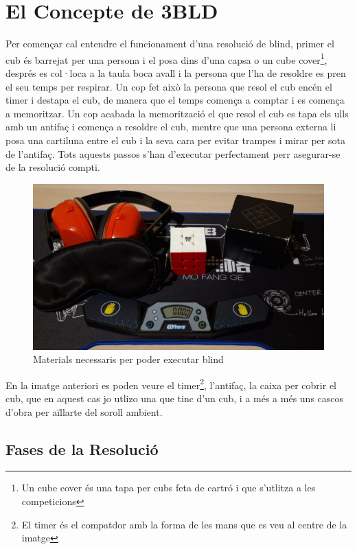 \section{El Concepte de 3BLD}

Per començar cal entendre el funcionament d'una resolució de blind, primer el cub és barrejat per una persona i el posa dins d'una capsa o un cube cover\footnote{Un cube cover és una tapa per cubs feta de cartró i que s'utlitza a les competicions}, després es col·loca a la taula boca avall i la persona que l'ha de resoldre es pren el seu temps per respirar. 
Un cop fet això la persona que resol el cub encén el timer i destapa el cub, de manera que el temps comença a comptar i es comença a memoritzar. Un cop acabada la memorització el que resol el cub es tapa els ulls amb un antifaç i comença a resoldre el cub, mentre que una persona externa li posa una cartiluna entre el cub i la seva cara per evitar trampes i mirar per sota de l'antifaç.
Tots aquests passos s'han d'executar perfectament perr asegurar-se de la resolució compti.

\begin{figure}[ht]
    \centering
    \includegraphics[width=12cm]{img/figures/materials-bld.jpg}
\caption{Materials necessaris per poder executar blind}
    \label{fig:materials-bld}
\end{figure}

En la imatge anteriori es poden veure el timer\footnote{El timer és el compatdor amb la forma de les mans que es veu al centre de la imatge}, l'antifaç, la caixa per cobrir el cub, que en aquest cas jo utlizo una que tinc d'un cub, i a més a més uns cascos d'obra per aïllarte del soroll ambient.

\vspace{0.5cm}
\subsection{Fases de la Resolució}

